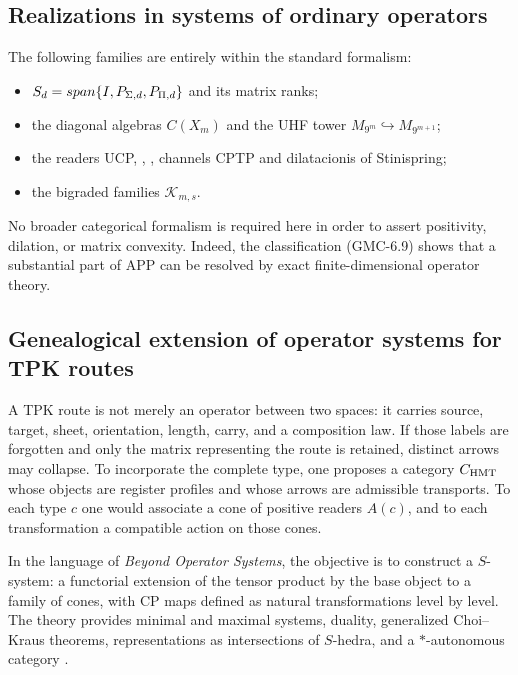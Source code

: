 \subsection{Realizations in systems of ordinary operators}

The following families are entirely within the standard formalism:

\begin{itemize}
 \item $\mathcal S_d=\Span\{I,P_{\Sigma,d},P_{\Pi,d}\}$ and its matrix
 ranks;
 \item the diagonal algebras $C(X_m)$ and the UHF tower
 $M_{9^m}\hookrightarrow M_{9^{m+1}}$;
 \item the readers UCP, \POVM, \PVM, channels CPTP and dilatacionis of
 Stinispring;
 \item the bigraded families $\mathcal K_{m,s}$.
\end{itemize}

No broader categorical formalism is required here in order to assert
positivity, dilation, or matrix convexity. Indeed, the classification
\textup{(GMC-6.9)} shows that a substantial part of APP can be resolved by
exact finite-dimensional operator theory.

\subsection{Genealogical extension of operator systems for TPK routes}

A TPK route is not merely an operator between two spaces: it carries source, target,
sheet, orientation, length, carry, and a composition law. If those
labels are forgotten and only the matrix representing the route is retained,
distinct arrows may collapse. To incorporate the complete type, one proposes
a category $\mathsf C_{\rm HMT}$ whose objects are register profiles and
whose arrows are admissible transports. To each type $c$ one would associate a
cone of positive readers $A(c)$, and to each transformation a
compatible action on those cones.

In the language of \emph{Beyond Operator Systems}, the objective is to construct a $S$-system: a functorial extension of the tensor product by the base object to a family of cones, with CP maps defined as natural transformations level by level. The theory provides minimal and maximal systems, duality, generalized Choi--Kraus theorems, representations as intersections of $S$-hedra, and a $*$-autonomous category \citep{delescoves2026beyond}.

